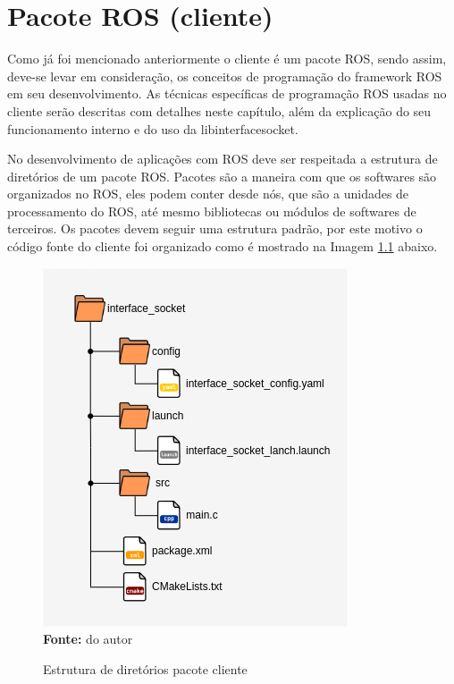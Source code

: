 \chapter{Pacote ROS (cliente)}

Como já foi mencionado anteriormente o cliente é um pacote ROS, sendo assim, deve-se levar em consideração, os conceitos de programação do framework ROS em seu desenvolvimento. As técnicas específicas de programação ROS usadas no cliente serão descritas com detalhes neste capítulo, além da explicação do seu funcionamento interno e do uso da libinterfacesocket.

No desenvolvimento de aplicações com ROS deve ser respeitada a estrutura de diretórios  de um pacote ROS. Pacotes são a maneira com que os softwares são organizados no ROS, eles podem conter desde nós, que são a unidades de processamento do ROS, até mesmo bibliotecas ou módulos de softwares de terceiros. Os pacotes devem seguir uma estrutura padrão, por este motivo o código fonte do cliente foi organizado como é mostrado na Imagem \ref{fig:clientdiretorios} abaixo.

\begin{figure}[ht]
	\caption{Estrutura de diretórios pacote cliente}
	\begin{center}
		\includegraphics[scale=0.47]{imagens/rospackage.png}\\
		{\small \textbf{Fonte:} do autor}
    \end{center}
    \label{fig:clientdiretorios}
\end{figure}

